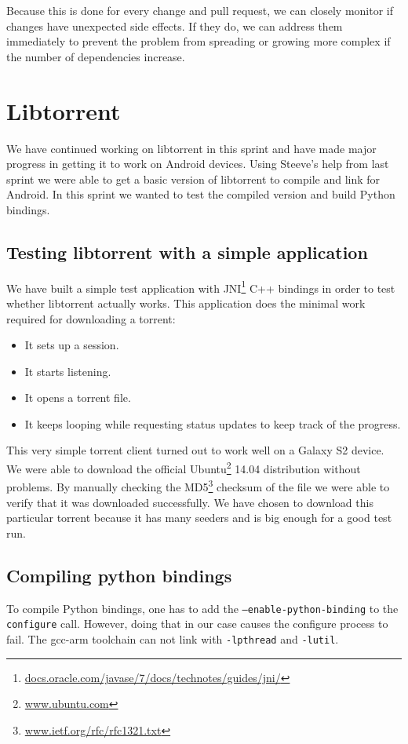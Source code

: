 		Because this is done for every change and pull request, we can closely monitor if changes have unexpected side effects. If they do, we can address them immediately to prevent the problem from spreading or growing more complex if the number of dependencies increase.
		
	
	\section{Libtorrent}
		We have continued working on libtorrent in this sprint and have made major progress in getting it to work on Android devices. Using Steeve's help from last sprint we were able to get a basic version of libtorrent to compile and link for Android. In this sprint we wanted to test the compiled version and build Python bindings.
		
		\subsection{Testing libtorrent with a simple application}
			We have built a simple test application with JNI\footnote{\href{http://docs.oracle.com/javase/7/docs/technotes/guides/jni/}{docs.oracle.com/javase/7/docs/technotes/guides/jni/}} C++ bindings in order to test whether libtorrent actually works. This application does the minimal work required for downloading a torrent:
			\begin{itemize}
				\item It sets up a session.
				\item It starts listening.
				\item It opens a torrent file.
				\item It keeps looping while requesting status updates to keep track of the progress.
			\end{itemize}
			This very simple torrent client turned out to work well on a Galaxy S2 device. We were able to download the official Ubuntu\footnote{\href{http://www.ubuntu.com}{www.ubuntu.com}} 14.04 distribution without problems. By manually checking the MD5\footnote{\href{http://www.ietf.org/rfc/rfc1321.txt}{www.ietf.org/rfc/rfc1321.txt}} checksum of the file we were able to verify that it was downloaded successfully. We have chosen to download this particular torrent because it has many seeders and is big enough for a good test run.
		
		\subsection{Compiling python bindings}
			To compile Python bindings, one has to add the \texttt{--enable-python-binding} to the \texttt{configure} call. However, doing that in our case causes the configure process to fail. The gcc-arm toolchain can not link with \texttt{-lpthread} and \texttt{-lutil}.
			
